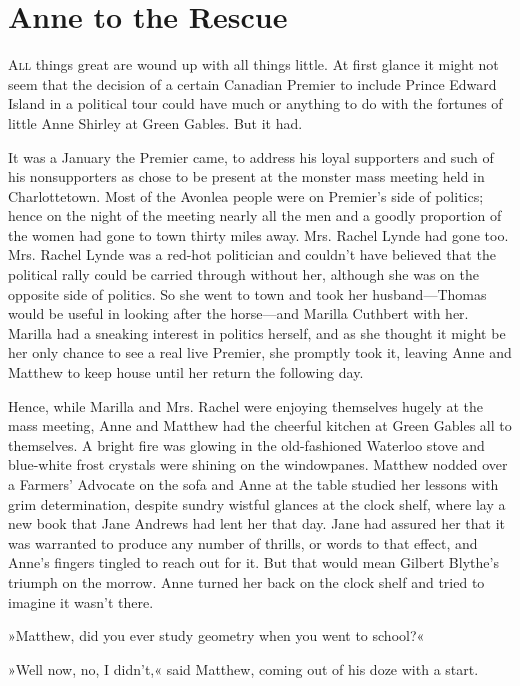 \chapter{Anne to the Rescue}
	
\lettrine[lines=4]{A}{ll} things great are wound up with all things little. At first glance it might not seem that the decision of a certain Canadian Premier to include Prince Edward Island in a political tour could have much or anything to do with the fortunes of little Anne Shirley at Green Gables. But it had.

It was a January the Premier came, to address his loyal supporters and such of his nonsupporters as chose to be present at the monster mass meeting held in Charlottetown. Most of the Avonlea people were on Premier’s side of politics; hence on the night of the meeting nearly all the men and a goodly proportion of the women had gone to town thirty miles away. Mrs. Rachel Lynde had gone too. Mrs. Rachel Lynde was a red-hot politician and couldn’t have believed that the political rally could be carried through without her, although she was on the opposite side of politics. So she went to town and took her husband—Thomas would be useful in looking after the horse—and Marilla Cuthbert with her. Marilla had a sneaking interest in politics herself, and as she thought it might be her only chance to see a real live Premier, she promptly took it, leaving Anne and Matthew to keep house until her return the following day.

Hence, while Marilla and Mrs. Rachel were enjoying themselves hugely at the mass meeting, Anne and Matthew had the cheerful kitchen at Green Gables all to themselves. A bright fire was glowing in the old-fashioned Waterloo stove and blue-white frost crystals were shining on the windowpanes. Matthew nodded over a Farmers’ Advocate on the sofa and Anne at the table studied her lessons with grim determination, despite sundry wistful glances at the clock shelf, where lay a new book that Jane Andrews had lent her that day. Jane had assured her that it was warranted to produce any number of thrills, or words to that effect, and Anne’s fingers tingled to reach out for it. But that would mean Gilbert Blythe’s triumph on the morrow. Anne turned her back on the clock shelf and tried to imagine it wasn’t there.

»Matthew, did you ever study geometry when you went to school?«

»Well now, no, I didn’t,« said Matthew, coming out of his doze with a start.

